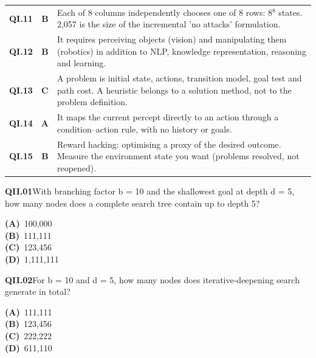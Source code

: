 \documentclass[11pt]{article}
\begin{document}
\begin{longtable}{>{\leavevmode\bfseries\color{navy}}p{1.3cm} c p{13.2cm}}
QI.11&\textbf{\color{leaf}B}&Each of 8 columns independently chooses one of 8 rows: 8$^8$ states. 2,057 is the size of the incremental 'no attacks' formulation.\\
\rowcolor{ivory}QI.12&\textbf{\color{leaf}B}&It requires perceiving objects (vision) and manipulating them (robotics) in addition to NLP, knowledge representation, reasoning and learning.\\
QI.13&\textbf{\color{leaf}C}&A problem is initial state, actions, transition model, goal test and path cost. A heuristic belongs to a solution method, not to the problem definition.\\
\rowcolor{ivory}QI.14&\textbf{\color{leaf}A}&It maps the current percept directly to an action through a condition--action rule, with no history or goals.\\
QI.15&\textbf{\color{leaf}B}&Reward hacking: optimising a proxy of the desired outcome. Measure the environment state you want (problems resolved, not reopened).\\
\end{longtable}
\newpage
{}
\begin{tcolorbox}[enhanced,breakable,colback=white,colframe=navyL,arc=2mm,boxrule=0.7pt,left=3mm,right=3mm,top=2mm,bottom=2mm]
\textbf{\color{navy}QII.01}\quad With branching factor b = 10 and the shallowest goal at depth d = 5, how many nodes does a complete search tree contain up to depth 5?\hfill{}\par\smallskip
{\small \textbf{\color{navyL}(A)}\ 100,000\\[1pt]\textbf{\color{navyL}(B)}\ 111,111\\[1pt]\textbf{\color{navyL}(C)}\ 123,456\\[1pt]\textbf{\color{navyL}(D)}\ 1,111,111}
\end{tcolorbox}
\begin{tcolorbox}[enhanced,breakable,colback=white,colframe=navyL,arc=2mm,boxrule=0.7pt,left=3mm,right=3mm,top=2mm,bottom=2mm]
\textbf{\color{navy}QII.02}\quad For b = 10 and d = 5, how many nodes does iterative-deepening search generate in total?\hfill{}\par\smallskip
{\small \textbf{\color{navyL}(A)}\ 111,111\\[1pt]\textbf{\color{navyL}(B)}\ 123,456\\[1pt]\textbf{\color{navyL}(C)}\ 222,222\\[1pt]\textbf{\color{navyL}(D)}\ 611,110}
\end{tcolorbox}
\end{document}
